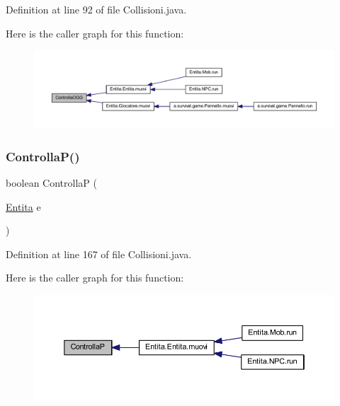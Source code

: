 Definition at line 92 of file Collisioni.\+java.

Here is the caller graph for this function\+:
\nopagebreak
\begin{figure}[H]
\begin{center}
\leavevmode
\includegraphics[width=350pt]{classa_1_1survival_1_1game_1_1_collisioni_ad38c8b3c50bbbd655ef3f9e2c80b21e0_icgraph}
\end{center}
\end{figure}
\mbox{\label{classa_1_1survival_1_1game_1_1_collisioni_ab8b33fe794da631b2ee55f7b77bf31d5}} 
\subsubsection{\texorpdfstring{Controlla\+P()}{ControllaP()}}
{\footnotesize\ttfamily boolean ControllaP (\begin{DoxyParamCaption}\item[{\hyperlink{class_entita_1_1_entita}{Entita}}]{e }\end{DoxyParamCaption})}



Definition at line 167 of file Collisioni.\+java.

Here is the caller graph for this function\+:
\nopagebreak
\begin{figure}[H]
\begin{center}
\leavevmode
\includegraphics[width=350pt]{classa_1_1survival_1_1game_1_1_collisioni_ab8b33fe794da631b2ee55f7b77bf31d5_icgraph}
\end{center}
\end{figure}
\mbox{\label{classa_1_1survival_1_1game_1_1_collisioni_a87a22cc62f824d7a4e9a017a9b36b019}} 
